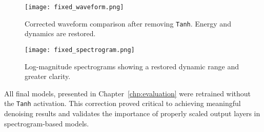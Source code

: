\begin{figure}[H]
    \centering
    \texttt{[image: fixed\_waveform.png]}
    \caption{\label{fig:restored_waveform} Corrected waveform comparison after removing \texttt{Tanh}. Energy and dynamics are restored.}
\end{figure}

\begin{figure}[H]
    \centering
    \texttt{[image: fixed\_spectrogram.png]}
    \caption{\label{fig:restored_spectrogram} Log-magnitude spectrograms showing a restored dynamic range and greater clarity.}
\end{figure}

All final models, presented in Chapter~\ref{chp:evaluation} were retrained without the \texttt{Tanh} activation. This correction proved critical to achieving meaningful denoising results and validates the importance of properly scaled output layers in spectrogram-based models.
